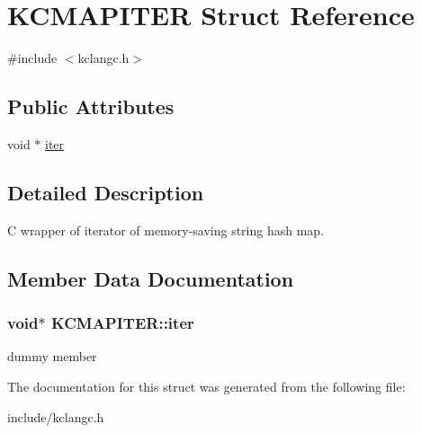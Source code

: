 \hypertarget{structKCMAPITER}{\section{\-K\-C\-M\-A\-P\-I\-T\-E\-R \-Struct \-Reference}
\label{structKCMAPITER}
}


{\ttfamily \#include $<$kclangc.\-h$>$}

\subsection*{\-Public \-Attributes}
\begin{DoxyCompactItemize}
\item 
void $\ast$ \hyperlink{structKCMAPITER_a63dba08f58d7add3830b49e0ffab47fc}{iter}
\end{DoxyCompactItemize}


\subsection{\-Detailed \-Description}
\-C wrapper of iterator of memory-\/saving string hash map. 

\subsection{\-Member \-Data \-Documentation}
\hypertarget{structKCMAPITER_a63dba08f58d7add3830b49e0ffab47fc}{
\subsubsection[{iter}]{\setlength{\rightskip}{0pt plus 5cm}void$\ast$ {\bf \-K\-C\-M\-A\-P\-I\-T\-E\-R\-::iter}}}\label{structKCMAPITER_a63dba08f58d7add3830b49e0ffab47fc}
dummy member 

\-The documentation for this struct was generated from the following file\-:\begin{DoxyCompactItemize}
\item 
include/kclangc.\-h\end{DoxyCompactItemize}
